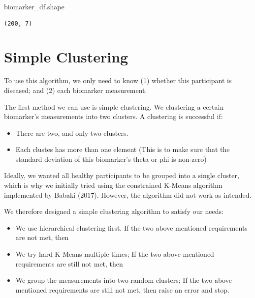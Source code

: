 \documentclass[
  letterpaper,
  DIV=11,
  numbers=noendperiod]{scrreprt}
\newenvironment{Shaded}{\begin{snugshade}}{\end{snugshade}}
\newcommand{\NormalTok}[1]{\textcolor[rgb]{0.00,0.23,0.31}{#1}}
\providecommand{\tightlist}{%
  \setlength{\itemsep}{0pt}\setlength{\parskip}{0pt}}\usepackage{longtable,booktabs,array}
\begin{document}
\begin{Shaded}
\begin{Highlighting}[]
\NormalTok{biomarker\_df.shape}
\end{Highlighting}
\end{Shaded}

\begin{verbatim}
(200, 7)
\end{verbatim}

\section{Simple Clustering}\label{sec-cop-kmeans}

\begin{tcolorbox}[enhanced jigsaw, breakable, bottomtitle=1mm, toprule=.15mm, colframe=quarto-callout-tip-color-frame, colbacktitle=quarto-callout-tip-color!10!white, arc=.35mm, bottomrule=.15mm, left=2mm, opacitybacktitle=0.6, toptitle=1mm, colback=white, opacityback=0, title=\textcolor{quarto-callout-tip-color}{\faLightbulb}\hspace{0.5em}{Tip}, titlerule=0mm, rightrule=.15mm, leftrule=.75mm, coltitle=black]

To use this algorithm, we only need to know (1) whether this participant
is diseased; and (2) each biomarker measurement.

\end{tcolorbox}

The first method we can use is simple clustering. We clustering a
certain biomarker's measurements into two clusters. A clustering is
successful if:

\begin{itemize}
\tightlist
\item
  There are two, and only two clusters.
\item
  Each clustes has more than one element (This is to make sure that the
  standard deviation of this biomarker's theta or phi is non-zero)
\end{itemize}

Ideally, we wanted all healthy participants to be grouped into a single
cluster, which is why we initially tried using the constrained K-Means
algorithm implemented by Babaki (2017). However, the algorithm did not
work as intended.

We therefore designed a simple clustering algorithm to satisfy our
needs:

\begin{itemize}
\tightlist
\item
  We use hierarchical clustering first. If the two above mentioned
  requirements are not met, then
\item
  We try hard K-Means multiple times; If the two above mentioned
  requirements are still not met, then
\item
  We group the measurements into two random clusters; If the two above
  mentioned requirements are still not met, then raise an error and
  stop.
\end{itemize}
\end{document}
